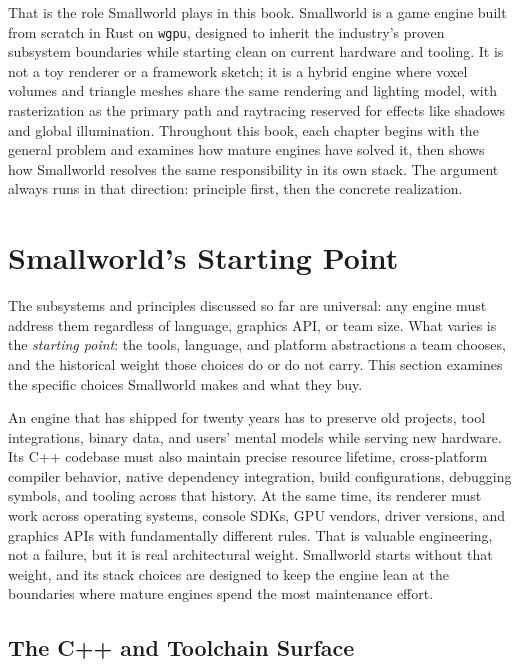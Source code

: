 \documentclass[
  11pt,
  letterpaper,
  DIV=11,
  numbers=noendperiod,
  twoside,
  open=right]{scrreprt}
\begin{document}
That is the role Smallworld plays in this book. Smallworld is a game
engine built from scratch in Rust on \texttt{wgpu}, designed to inherit
the industry's proven subsystem boundaries while starting clean on
current hardware and tooling. It is not a toy renderer or a framework
sketch; it is a hybrid engine where voxel volumes and triangle meshes
share the same rendering and lighting model, with rasterization as the
primary path and raytracing reserved for effects like shadows and global
illumination. Throughout this book, each chapter begins with the general
problem and examines how mature engines have solved it, then shows how
Smallworld resolves the same responsibility in its own stack. The
argument always runs in that direction: principle first, then the
concrete realization.

\section{Smallworld's Starting Point}\label{smallworlds-starting-point}

The subsystems and principles discussed so far are universal: any engine
must address them regardless of language, graphics API, or team size.
What varies is the \emph{starting point}: the tools, language, and
platform abstractions a team chooses, and the historical weight those
choices do or do not carry. This section examines the specific choices
Smallworld makes and what they buy.

An engine that has shipped for twenty years has to preserve old
projects, tool integrations, binary data, and users' mental models while
serving new hardware. Its C++ codebase must also maintain precise
resource lifetime, cross-platform compiler behavior, native dependency
integration, build configurations, debugging symbols, and tooling across
that history. At the same time, its renderer must work across operating
systems, console SDKs, GPU vendors, driver versions, and graphics APIs
with fundamentally different rules. That is valuable engineering, not a
failure, but it is real architectural weight. Smallworld starts without
that weight, and its stack choices are designed to keep the engine lean
at the boundaries where mature engines spend the most maintenance
effort.

\subsection{The C++ and Toolchain
Surface}\label{the-c-and-toolchain-surface}
\end{document}
